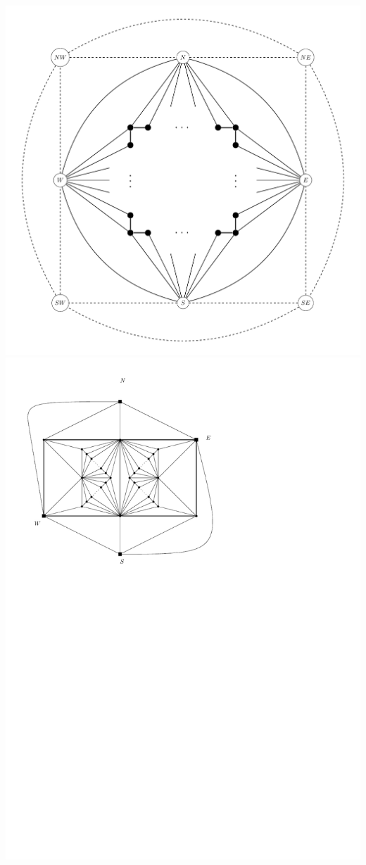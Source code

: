 \documentclass[a4paper]{article}
\begin{document}
\includegraphics[scale=0.4]{fixExtension/img/scafold}
\clearpage%
\includegraphics[scale=.7]{fixExtension/img/manymanybase}
\end{document}
